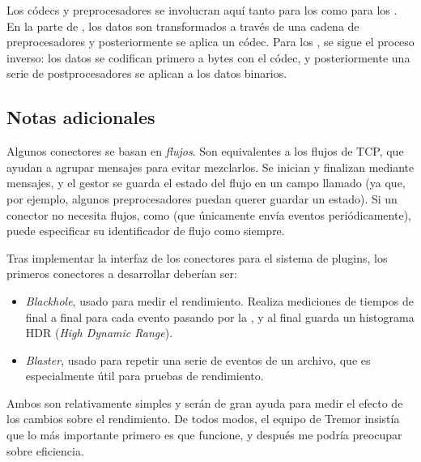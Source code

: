 Los códecs y preprocesadores se involucran aquí tanto para los \sources como
para los \sinks. En la parte de \source, los datos son transformados a través de
una cadena de preprocesadores y posteriormente se aplica un códec. Para los
\sinks, se sigue el proceso inverso: los datos se codifican primero a bytes con
el códec, y posteriormente una serie de postprocesadores se aplican a los datos
binarios.

\subsection{Notas adicionales}

Algunos conectores se basan en \emph{flujos}. Son equivalentes a los flujos de
TCP, que ayudan a agrupar mensajes para evitar mezclarlos. Se inician y
finalizan mediante mensajes, y el gestor se guarda el estado del flujo en un
campo llamado  (ya que, por ejemplo, algunos preprocesadores puedan
querer guardar un estado). Si un conector no necesita flujos, como
 (que únicamente envía eventos periódicamente), puede
especificar su identificador de flujo como  siempre.

Tras implementar la interfaz de los conectores para el sistema de plugins,
los primeros conectores a desarrollar deberían ser:

\begin{itemize}
    \item \emph{Blackhole}, usado para medir el rendimiento. Realiza mediciones
        de tiempos de final a final para cada evento pasando por la \pipeline, y
        al final guarda un histograma HDR (\emph{High Dynamic Range}).

    \item \emph{Blaster}, usado para repetir una serie de eventos de un archivo,
        que es especialmente útil para pruebas de rendimiento.

\end{itemize}

Ambos son relativamente simples y serán de gran ayuda para medir el efecto de
los cambios sobre el rendimiento. De todos modos, el equipo de Tremor insistía
que lo más importante primero es que funcione, y después me podría preocupar
sobre eficiencia.

